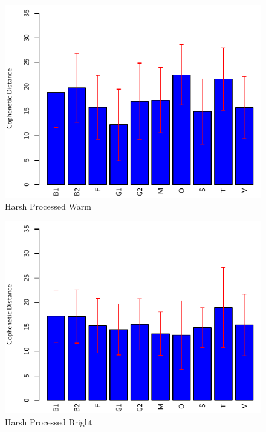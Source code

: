 		\begin{figure}[h!]
			\centering
			\includegraphics{chapter7/Images/HarshProcessedWarmBar.pdf}
			\caption{Harsh Processed Warm}
		\end{figure}

		\begin{figure}[h!]
			\centering
			\includegraphics{chapter7/Images/HarshProcessedBrightBar.pdf}
			\caption{Harsh Processed Bright}
		\end{figure}

